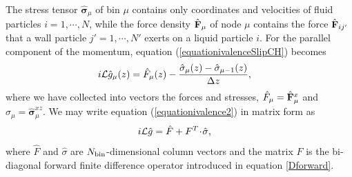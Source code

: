 \documentclass[b5paper,openright,10pt]{book}
\newcommand{\esc}{\!\cdot\!}
\begin{document}
The  stress   tensor  $\hat{\boldsymbol{\sigma}}_\mu$  of   bin  $\mu$
contains  only   coordinates  and   velocities  of   fluid  particles
$i=1,\cdots,N$,  while the  force  density $\hat{\bf  F}_\mu$ of  node
$\mu$ contains  the force  $\hat{\bf F}_{ij'}$  that a  wall particle
$j'=1,\cdots, N'$  exerts on a  liquid particle $i$.  
For  the parallel  component of  the
momentum, equation (\ref{equationivalenceSlipCH}) becomes
\begin{align}
  i{\cal L}\hat{g}_\mu(z) &=\hat{F}_\mu(z)-\frac{\hat{\sigma}_\mu(z)-\hat{\sigma}_{\mu-1}(z)}{\Delta z},
\label{equationivalence2}
\end{align}
where  we  have  collected  into  vectors  the  forces  and  stresses,
$\hat{F}_\mu=\hat{\bf                   F}_\mu^x$                  and
$\hat{\sigma}_\mu=\hat{\boldsymbol{\sigma}}^{xz}_\mu$.   We may  write
equation (\ref{equationivalence2}) in matrix form as
\begin{align}
  i{\cal L}\hat{g}&= \hat{F}+ F^T\esc\hat{\sigma},
\label{iLgMat2}
\end{align}
where $\hat{F}$ and $\hat{\sigma}$ are $N_{\rm bin}$-dimensional column vectors and 
the matrix $ F$  is the bi-diagonal forward finite difference
operator introduced in equation \ref{Dforward}.
\end{document}
